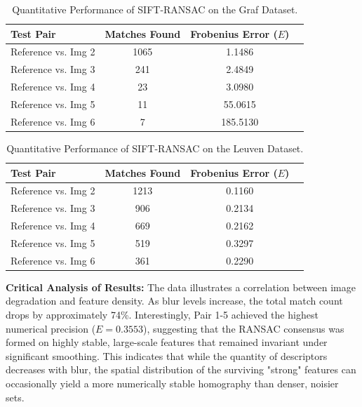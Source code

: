 \documentclass{article}
\begin{document}
\begin{table}[H]
\centering
\caption{Quantitative Performance of SIFT-RANSAC on the Graf Dataset.}
\label{tab:sift_results}
\begin{tabular}{lccc}
\toprule
\textbf{Test Pair} & \textbf{Matches Found} & \textbf{Frobenius Error ($E$)} \\ \midrule
Reference vs. Img 2    & 1065                    & 1.1486                        \\
Reference vs. Img 3    & 241                    & 2.4849                        \\
Reference vs. Img 4    & 23                    & 3.0980                        \\
Reference vs. Img 5    & 11                    & 55.0615                        \\
Reference vs. Img 6    & 7                    & 185.5130                        \\ \bottomrule
\end{tabular}
\end{table}

\begin{table}[H]
\centering
\caption{Quantitative Performance of SIFT-RANSAC on the Leuven Dataset.}
\label{tab:sift_results}
\begin{tabular}{lccc}
\toprule
\textbf{Test Pair} & \textbf{Matches Found} & \textbf{Frobenius Error ($E$)} \\ \midrule
Reference vs. Img 2    & 1213                    & 0.1160                        \\
Reference vs. Img 3    & 906                    & 0.2134                        \\
Reference vs. Img 4    & 669                    & 0.2162                        \\
Reference vs. Img 5    & 519                    & 0.3297                        \\
Reference vs. Img 6    & 361                    & 0.2290                        \\ \bottomrule
\end{tabular}
\end{table}

\FloatBarrier %

\textbf{Critical Analysis of Results:}
The data illustrates a correlation between image degradation and feature density. As blur levels increase, the total match count drops by approximately 74\%. Interestingly, Pair 1-5 achieved the highest numerical precision ($E = 0.3553$), suggesting that the RANSAC consensus was formed on highly stable, large-scale features that remained invariant under significant smoothing. This indicates that while the quantity of descriptors decreases with blur, the spatial distribution of the surviving "strong" features can occasionally yield a more numerically stable homography than denser, noisier sets.
\end{document}
